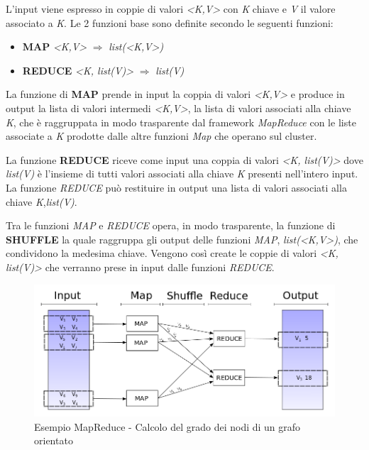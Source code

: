 \documentclass[LaM,binding=0.6cm]{sapthesis}
\begin{document}
L'input viene espresso in coppie  di valori \textit{<K,V>} con \textit{K} chiave e \textit{V} il valore associato a \textit{K}.	
Le 2 funzioni base sono definite secondo le seguenti funzioni:
\begin{itemize}
\item \textbf{MAP }	\textit{<K,V>} $\Rightarrow$ \textit{list(<K,V>)}
\item\textbf{REDUCE}	\textit{<K, list(V)>} $\Rightarrow$ \textit{list(V)}
\end{itemize}

La funzione di \textbf{MAP} prende in input la coppia di valori \textit{<K,V>} e produce in output la lista di valori intermedi \textit{<K,V>}, la lista di valori associati alla chiave \textit{K}, che è raggruppata in modo trasparente dal framework \textit{MapReduce} con le liste associate a \textit{K} prodotte dalle altre funzioni \textit{Map} che operano sul cluster.
 
La funzione \textbf{REDUCE} riceve come input una coppia di valori \textit{<K,  list(V)>} dove \textit{list(V)} è l'insieme di tutti valori  associati alla chiave \textit{K} presenti nell'intero input.
La funzione \textit{REDUCE} può restituire in output una lista di valori associati alla chiave \textit{K},\textit{list(V)}.

Tra le funzioni \textit{MAP} e \textit{REDUCE} opera, in modo trasparente, la funzione di \textbf{SHUFFLE} la quale raggruppa gli output delle funzioni \textit{MAP}, \textit{list(<K,V>)},  che condividono la medesima chiave. Vengono così create le coppie di valori \textit{<K, list(V)>} che verranno prese in input dalle funzioni \textit{REDUCE}.

\begin{figure}
\centering
\includegraphics[width=1\textwidth]{esempio_degree}
\caption{Esempio MapReduce - Calcolo del grado dei nodi di un grafo orientato}
\label{fig:SchemaMapReduce}
\end{figure}
\end{document}
